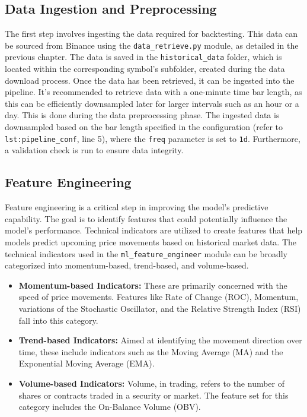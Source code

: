 \subsection{Data Ingestion and Preprocessing}
The first step involves ingesting the data required for backtesting. This data can be sourced from Binance using the \texttt{data\_retrieve.py} module, as detailed in the previous chapter.
The data is saved in the \texttt{historical\_data} folder, which is located within the corresponding symbol's subfolder, created during the data download process.
Once the data has been retrieved, it can be ingested into the pipeline. It's recommended to retrieve data with a one-minute time bar length,
as this can be efficiently downsampled later for larger intervals such as an hour or a day.
This is done during the data preprocessing phase. The ingested data is downsampled based on the bar length specified in the configuration (refer to \lstinline[label=lst:pipeline_conf]{lst:pipeline_conf}, line 5), where the \texttt{freq} parameter is set to \texttt{1d}.
Furthermore, a validation check is run to ensure data integrity.

\FloatBarrier %
\subsection{Feature Engineering}
Feature engineering is a critical step in improving the model's predictive capability.
The goal is to identify features that could potentially influence the model's performance.
Technical indicators are utilized to create features that help models predict upcoming price movements based on historical market data.
The technical indicators used in the \texttt{ml\_feature\_engineer} module can be broadly categorized into momentum-based, trend-based, and volume-based.


\begin{itemize}
    \item \textbf{Momentum-based Indicators:} These are primarily concerned with the speed of price movements. Features like Rate of Change (ROC), Momentum, variations of the Stochastic Oscillator, and the Relative Strength Index (RSI) fall into this category.

    \item \textbf{Trend-based Indicators:} Aimed at identifying the movement direction over time, these include indicators such as the Moving Average (MA) and the Exponential Moving Average (EMA).

    \item \textbf{Volume-based Indicators:} Volume, in trading, refers to the number of shares or contracts traded in a security or market. The feature set for this category includes the On-Balance Volume (OBV).
\end{itemize}


